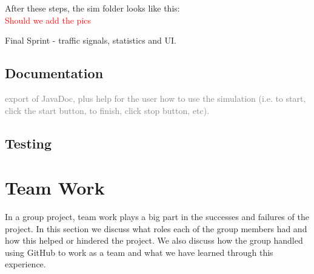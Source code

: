 \documentclass{article}
\begin{document}
	\noindent
	After these steps, the sim folder looks like this: \\
	\textcolor{red}{Should we add the pics}
	
	Final Sprint - traffic signals, statistics and UI. 
	
	\subsection{Documentation}
	\textcolor{gray}{export of JavaDoc, plus help for the user how to use the simulation (i.e. to start, click the start button, to finish, click stop button, etc).}
	
	
	\subsection{Testing}
	
	\section{Team Work}
	In a group project, team work plays a big part in the successes and failures of the project. In this section we discuss what roles each of the group members had and how this helped or hindered the project. We also discuss how the group handled using GitHub to work as a team and what we have learned through this experience. 
	
\end{document}
